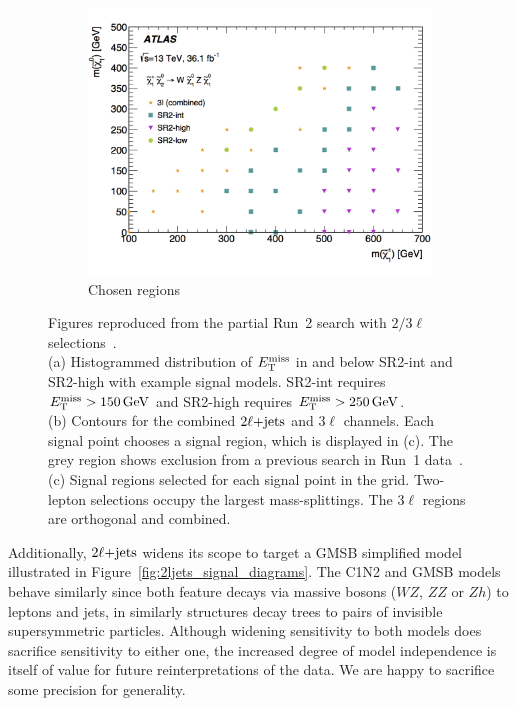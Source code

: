 \begin{figure}[tp]
\begin{subfigure}{0.46\textwidth}
  \includegraphics[width=\textwidth]{figures/2ljets_23l_chosen_regions.png}
  \caption{Chosen regions}
\end{subfigure}
\caption{%
Figures reproduced from the partial Run~2 search with $2/3\ell$
selections~\cite{atlas_23l_SUSY_2016_24, hepdata.81996}.
\\[0.5em]
(a) Histogrammed distribution of $\met$ in and below SR2-int and SR2-high with
example signal models.
SR2-int requires $\met > 150\,\eV[G]$ and SR2-high requires $\met > 250\,\eV[G]$.
\\[0.5em]
(b) Contours for the combined $\twoljets$ and $3\ell$ channels.
Each signal point chooses a signal region, which is displayed in (c).
The grey region shows exclusion from a previous search in Run~1
data~\cite{atlas_2l_SUSY_2013_11}.
\\[0.5em]
(c) Signal regions selected for each signal point in the grid.
Two-lepton selections occupy the largest mass-splittings.
The $3\ell$ regions are orthogonal and combined.
}
\label{fig:2ljets_23l_stuff}
\end{figure}

Additionally, $\twoljets$ widens its scope to target a GMSB simplified model
illustrated in Figure~\ref{fig:2ljets_signal_diagrams}.
The C1N2 and GMSB models behave similarly since both feature decays via massive
bosons ($WZ$, $ZZ$ or $Zh$) to leptons and jets, in similarly structures decay
trees to pairs of invisible supersymmetric particles.
Although widening sensitivity to both models does sacrifice sensitivity to
either one, the increased degree of model independence is itself of value for
future reinterpretations of the data.
We are happy to sacrifice some precision for generality.


